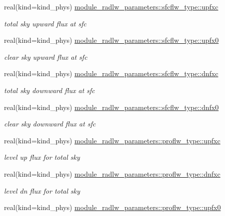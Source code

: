 \begin{DoxyCompactItemize}
real(kind=kind\+\_\+phys) \hyperlink{group__module__radlw__main_gab281301c9fad950c86a379cdec0963aa}{module\+\_\+radlw\+\_\+parameters\+::sfcflw\+\_\+type\+::upfxc}
\begin{DoxyCompactList}\small\item\em total sky upward flux at sfc \end{DoxyCompactList}\item 
real(kind=kind\+\_\+phys) \hyperlink{group__module__radlw__main_gab186f43f5f87043de996c1fa6f59dc6e}{module\+\_\+radlw\+\_\+parameters\+::sfcflw\+\_\+type\+::upfx0}
\begin{DoxyCompactList}\small\item\em clear sky upward flux at sfc \end{DoxyCompactList}\item 
real(kind=kind\+\_\+phys) \hyperlink{group__module__radlw__main_gae65c0014042ceffec4293e4d300f9cb8}{module\+\_\+radlw\+\_\+parameters\+::sfcflw\+\_\+type\+::dnfxc}
\begin{DoxyCompactList}\small\item\em total sky downward flux at sfc \end{DoxyCompactList}\item 
real(kind=kind\+\_\+phys) \hyperlink{group__module__radlw__main_gadac8d084ff59310f6c6f4fdff1a0e5e6}{module\+\_\+radlw\+\_\+parameters\+::sfcflw\+\_\+type\+::dnfx0}
\begin{DoxyCompactList}\small\item\em clear sky downward flux at sfc \end{DoxyCompactList}\item 
real(kind=kind\+\_\+phys) \hyperlink{group__module__radlw__main_gaefd4bfa2053b7e88173ac73ca219a9b2}{module\+\_\+radlw\+\_\+parameters\+::proflw\+\_\+type\+::upfxc}
\begin{DoxyCompactList}\small\item\em level up flux for total sky \end{DoxyCompactList}\item 
real(kind=kind\+\_\+phys) \hyperlink{group__module__radlw__main_ga5f7ae4abe7912e8dbe371b577ba91945}{module\+\_\+radlw\+\_\+parameters\+::proflw\+\_\+type\+::dnfxc}
\begin{DoxyCompactList}\small\item\em level dn flux for total sky \end{DoxyCompactList}\item 
real(kind=kind\+\_\+phys) \hyperlink{group__module__radlw__main_ga90ec3938bb024acfd6f78d597890e78a}{module\+\_\+radlw\+\_\+parameters\+::proflw\+\_\+type\+::upfx0}

\end{DoxyCompactItemize}

